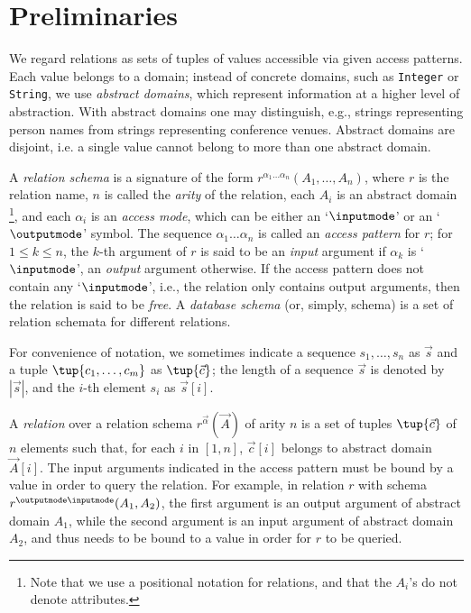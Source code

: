 \section{Preliminaries}\label{sec:preliminaries}

We regard relations as sets of tuples of values accessible via given access patterns. Each value belongs to a domain; instead of concrete domains, such as \texttt{Integer} or \texttt{String}, we use \emph{abstract domains}, which represent information at a higher level of abstraction. With abstract domains one may distinguish, e.g., strings representing person names from strings representing conference venues. Abstract domains are disjoint, i.e. a single value cannot belong to more than one abstract domain.

A \emph{relation schema} is a signature of the form $r^{\alpha_1\dots\alpha_n}(A_{1},\dots,A_{n})$, where $r$ is the relation name, $n$ is called the \emph{arity} of the relation, each $A_{i}$ is an abstract domain \footnote{Note that we use a positional notation for relations, and that the $A_i$'s do not denote attributes.}, and each $\alpha_i$ is an \emph{access mode}, which can be either an `$\inputmode$' or an `$\outputmode$' symbol.
The sequence $\alpha_1\dots\alpha_n$ is called an \emph{access pattern} for $r$; for $1\leq k \leq n$, the $k$-th argument of $r$ is said to be an \emph{input} argument if $\alpha_k$ is `$\inputmode$', an \emph{output} argument otherwise.
If the access pattern does not contain any `$\inputmode$', i.e., the relation only contains output arguments, then the relation is said to be \emph{free}.
A \emph{database schema} (or, simply, schema) is a set of relation schemata for different relations.

For convenience of notation, we sometimes indicate a sequence $s_{1},\dots,s_{n}$ as $\vec s$ and a tuple $\tup{c_{1},\dots,c_{m}}$ as $\tup{\vec c}$; the length of a sequence $\vec s$ is denoted by $|\vec s|$, and the $i$-th element $s_i$ as $\vec s[i]$.

A \emph{relation} over a relation schema $r^{\vec\alpha}(\vec A)$ of arity $n$ is a set of tuples $\tup{\vec c}$ of $n$ elements such that, for each $i$ in $[1,n]$, $\vec c[i]$ belongs to abstract domain $\vec A[i]$. The input arguments indicated in the access pattern must be bound by a value in order to query the relation. For example, in relation $r$ with schema $r^{\outputmode\inputmode}(A_1,A_2)$, the first argument is an output argument of abstract domain $A_1$, while the second argument is an input argument of abstract domain $A_2$, and thus needs to be bound to a value in order for $r$ to be queried.

